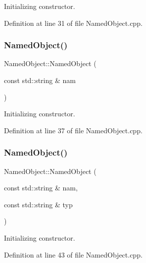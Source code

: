 Initializing constructor. 



Definition at line 31 of file Named\+Object.\+cpp.

\hypertarget{class_d_d4hep_1_1_named_object_a5d287da6b18dfb39eda2bbac78dabfb3}{}\label{class_d_d4hep_1_1_named_object_a5d287da6b18dfb39eda2bbac78dabfb3} 
\subsubsection{\texorpdfstring{Named\+Object()}{NamedObject()}\hspace{0.1cm}{\footnotesize\ttfamily [3/5]}}
{\footnotesize\ttfamily Named\+Object\+::\+Named\+Object (\begin{DoxyParamCaption}\item[{const std\+::string \&}]{nam }\end{DoxyParamCaption})}



Initializing constructor. 



Definition at line 37 of file Named\+Object.\+cpp.

\hypertarget{class_d_d4hep_1_1_named_object_ade52cf9617e164e408df2ca3bc2f90f5}{}\label{class_d_d4hep_1_1_named_object_ade52cf9617e164e408df2ca3bc2f90f5} 
\subsubsection{\texorpdfstring{Named\+Object()}{NamedObject()}\hspace{0.1cm}{\footnotesize\ttfamily [4/5]}}
{\footnotesize\ttfamily Named\+Object\+::\+Named\+Object (\begin{DoxyParamCaption}\item[{const std\+::string \&}]{nam,  }\item[{const std\+::string \&}]{typ }\end{DoxyParamCaption})}



Initializing constructor. 



Definition at line 43 of file Named\+Object.\+cpp.

